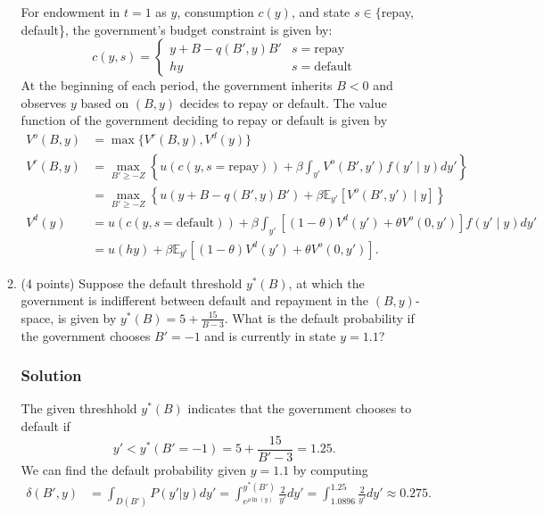 \documentclass[12pt]{article}
\begin{document}
\begin{enumerate}
\begin{enumerate}
        For endowment in $t=1$ as $y$, consumption $c(y)$, and state $s\in \{$repay, default\}, the government's budget constraint is given by:
        \[ c(y,s) = \begin{cases}
            y + B - q(B',y)B' & s=\text{repay}
            \\ hy & s=\text{default}
        \end{cases} 
        \]
        At the beginning of each period, the government inherits $B<0$ and observes $y$ based on $(B,y)$ decides to repay or default. The value function of the government deciding to repay or default is given by 
        \begin{align*}
            V^o(B,y) &= \max \{V^r(B,y), V^d(y)\}
            \\ V^r(B,y) &= \max_{B' \geq -Z} \left\{u(c(y,s=\text{repay}))+ \beta \int_{y'}  V^o(B',y') f(y' \mid y)dy' \right\}
            \\&= \max_{B' \geq -Z} \left\{u(y + B - q(B',y)B')+ \beta \mathbb{E}_{y'} \left[  V^o(B',y') \mid y  \right]\right\}
            \\ V^d(y) &=  u(c(y,s=\text{default})) + \beta \int_{y'}  \left[ (1-\theta)V^d(y') + \theta V^o(0,y') \right] f(y' \mid y) dy'
            \\ &=  u(hy) + \beta\mathbb{E}_{y'}  \left[ (1-\theta)V^d(y') + \theta V^o(0,y') \right] .
        \end{align*}

        \item (4 points) Suppose the default threshold $y^*(B)$, at which the government is indifferent between default and repayment in the $(B, y)$-space, is given by $y^*(B) = 5 + \frac{15}{B - 3}$. What is the default probability if the government chooses $B' = -1$ and is currently in state $y = 1.1$?
        \subsubsection*{Solution}

        The given threshhold $y^*(B)$ indicates that the government chooses to default if 
        \[ y' < y^*(B' = -1) = 5 + \frac{15}{B' - 3}= 1.25.\]
        We can find  the default probability given  $y = 1.1$ by computing 
        \begin{align*}
            \delta(B',y) &= \int_{D(B')} P(y'|y)dy'
            = \int^{y^*(B')}_{e^{\rho\ln(y)}} \frac{2}{y'}dy'
            = \int^{1.25}_{1.0896} \frac{2}{y'}dy'
            \approx 0.275.
        \end{align*}


\end{enumerate}
\end{enumerate}
\end{document}

